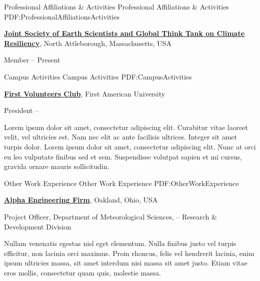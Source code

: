 \documentclass[letterpaper,MMMyyyy,nonstopmode]{simpleresumecv}
\begin{document}
\begin{Body}
{{%

\Section
{Professional Affiliations\newline
\& Activities}
{Professional Affiliations \& Activities}
{PDF:ProfessionalAffiliationsActivities}

\Entry
\href{http://www.example.com/my-society}
{\textbf{Joint Society of Earth Scientists and Global Think Tank on Climate Resiliency}},
\newline
North Attleborough, Massachusetts, USA

\Gap
\BulletItem
Member
\hfill
{} --
Present

\newpage


\Section
{Campus Activities}
{Campus Activities}
{PDF:CampusActivities}

\Entry
\href{http://www.example.com/my-club}
{\textbf{First Volunteers Club}},
First American University

\Gap
\BulletItem
President
\hfill
{} --
\begin{Detail}
\SubBulletItem
Lorem ipsum dolor sit amet, consectetur adipiscing elit.
\SubBulletItem
Curabitur vitae laoreet velit, vel ultricies est. Nam nec elit ac ante facilisis ultrices.
\SubBulletItem
Integer sit amet turpis dolor. Lorem ipsum dolor sit amet, consectetur adipiscing elit. Nunc at orci eu leo vulputate finibus sed et sem.
\SubBulletItem
Suspendisse volutpat sapien et mi cursus, gravida ornare mauris sollicitudin.
\end{Detail}


\Section
{Other Work\newline
Experience}
{Other Work Experience}
{PDF:OtherWorkExperience}

\Entry
\href{http://www.example.com/my-company}
{\textbf{Alpha Engineering Firm}},
Oakland, Ohio, USA

\Gap
\BulletItem
Project Officer,
Department of Meteorological Sciences,
\hfill
{} --
\newline
Research \& Development Division
\begin{Detail}
\SubBulletItem
Nullam venenatis egestas nisl eget elementum.
\SubBulletItem
Nulla finibus justo vel turpis efficitur, non lacinia orci maximus. Proin rhoncus, felis vel hendrerit lacinia, enim ipsum ultricies massa, sit amet interdum nisi massa sit amet justo.
\SubBulletItem
Etiam vitae eros mollis, consectetur quam quis, molestie massa.
\end{Detail}

}}
\end{Body}
\end{document}
